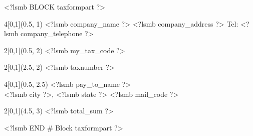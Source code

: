 <?lsmb BLOCK taxformpart ?>
\begin{textblock}{4}[0,1](0.5, 1)
<?lsmb company_name ?>
<?lsmb company_address ?>
Tel: <?lsmb company_telephone ?>
\end{textblock}

\begin{textblock}{2}[0,1](0.5, 2)
<?lsmb my_tax_code ?>
\end{textblock}

\begin{textblock}{2}[0,1](2.5, 2)
<?lsmb taxnumber ?>
\end{textblock}

\begin{textblock}{4}[0,1](0.5, 2.5)
<?lsmb pay_to_name ?>\\
<?lsmb city ?>, <?lsmb state ?> <?lsmb mail_code ?>
\end{textblock}

\begin{textblock}{2}[0,1](4.5, 3)
<?lsmb total_sum ?>
\end{textblock}
<?lsmb END # Block taxformpart ?>

